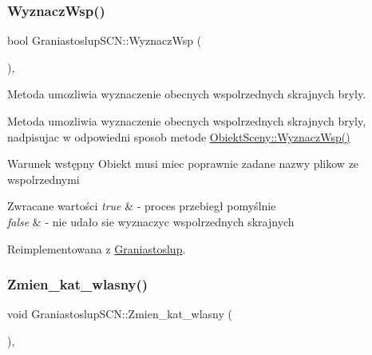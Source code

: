 \subsubsection{\texorpdfstring{Wyznacz\+Wsp()}{WyznaczWsp()}}
{\footnotesize\ttfamily bool Graniastoslup\+S\+C\+N\+::\+Wyznacz\+Wsp (\begin{DoxyParamCaption}{ }\end{DoxyParamCaption})\hspace{0.3cm}{\ttfamily [override]}, {\ttfamily [virtual]}}



Metoda umozliwia wyznaczenie obecnych wspolrzednych skrajnych bryly. 

Metoda umozliwia wyznaczenie obecnych wspolrzednych skrajnych bryly, nadpisujac w odpowiedni sposob metode \hyperlink{classObiektSceny_a24dd0332c0755d7155128639a9a3e2b4}{Obiekt\+Sceny\+::\+Wyznacz\+Wsp()}

\begin{DoxyPrecond}{Warunek wstępny}
Obiekt musi miec poprawnie zadane nazwy plikow ze wspolrzednymi 
\end{DoxyPrecond}

\begin{DoxyRetVals}{Zwracane wartości}
{\em true} & -\/ proces przebiegł pomyślnie \\
\hline
{\em false} & -\/ nie udało sie wyznaczyc wspolrzednych skrajnych \\
\hline
\end{DoxyRetVals}


Reimplementowana z \hyperlink{classGraniastoslup_a786313962b174b9c25084e45e827f39b}{Graniastoslup}.

\mbox{\label{classGraniastoslupSCN_a848f8d3f0298dda442fab7acec295f80}} 
\subsubsection{\texorpdfstring{Zmien\+\_\+kat\+\_\+wlasny()}{Zmien\_kat\_wlasny()}}
{\footnotesize\ttfamily void Graniastoslup\+S\+C\+N\+::\+Zmien\+\_\+kat\+\_\+wlasny (\begin{DoxyParamCaption}{ }\end{DoxyParamCaption})\hspace{0.3cm}{\ttfamily [inline]}, {\ttfamily [private]}}




